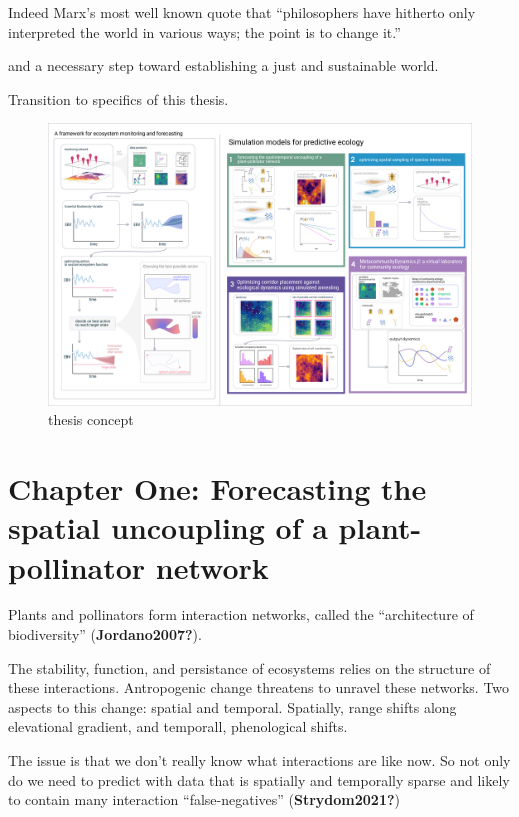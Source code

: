 \documentclass[10pt,oneside]{article}
\makeatletter
\def\maxwidth{\ifdim\Gin@nat@width>\linewidth\linewidth
\else\Gin@nat@width\fi}
\let\Oldincludegraphics\includegraphics
\renewcommand{\includegraphics}[1]{\Oldincludegraphics[width=\maxwidth]{#1}}
\makeatother
\begin{document}
Indeed Marx's most well known quote that ``philosophers have hitherto
only interpreted the world in various ways; the point is to change it.''

and a necessary step toward establishing a just and sustainable world.

Transition to specifics of this thesis.

\begin{figure}
\centering
\includegraphics{./figures/thesisconcept.png}
\caption{thesis concept}
\end{figure}

\hypertarget{chapter-one-forecasting-the-spatial-uncoupling-of-a-plant-pollinator-network}{%
\section{Chapter One: Forecasting the spatial uncoupling of a
plant-pollinator
network}\label{chapter-one-forecasting-the-spatial-uncoupling-of-a-plant-pollinator-network}}

Plants and pollinators form interaction networks, called the
``architecture of biodiversity'' (\textbf{Jordano2007?}).

The stability, function, and persistance of ecosystems relies on the
structure of these interactions. Antropogenic change threatens to
unravel these networks. Two aspects to this change: spatial and
temporal. Spatially, range shifts along elevational gradient, and
temporall, phenological shifts.

The issue is that we don't really know what interactions are like now.
So not only do we need to predict with data that is spatially and
temporally sparse and likely to contain many interaction
``false-negatives'' (\textbf{Strydom2021?})
\end{document}
